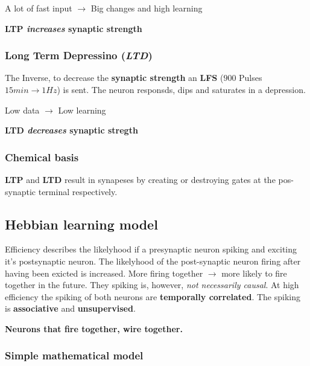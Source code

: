 \documentclass[
    fontsize      = 11pt,
    paper         = a4,
    twoside       = false,
    parskip       = half,
    pagesize      = false,
]{scrartcl}
\begin{document}
A lot of fast input \(\rightarrow\) Big changes and high learning

\textbf{LTP \emph{increases} synaptic strength}

\hypertarget{long-term-depressino-ltd}{%
\subsubsection{\texorpdfstring{Long Term Depressino
(\emph{LTD})}{Long Term Depressino (LTD)}}\label{long-term-depressino-ltd}}

The Inverse, to decrease the \textbf{synaptic strength} an \textbf{LFS}
(\(900\) Pulses \(15\si{min} \rightarrow 1\si{Hz}\)) is sent. The neuron
responsds, dips and saturates in a depression.

Low data \(\rightarrow\) Low learning

\textbf{LTD \emph{decreases} synaptic stregth}

\hypertarget{chemical-basis}{%
\subsubsection{Chemical basis}\label{chemical-basis}}

\textbf{LTP} and \textbf{LTD} result in synapeses by creating or
destroying gates at the pos-synaptic terminal respectively.

\hypertarget{hebbian-learning-model}{%
\subsection{Hebbian learning model}\label{hebbian-learning-model}}

Efficiency describes the likelyhood if a presynaptic neuron spiking and
exciting it's postsynaptic neuron. The likelyhood of the post-synaptic
neuron firing after having been exicted is increased. More firing
together \(\rightarrow\) more likely to fire together in the future.
They spiking is, however, \emph{not necessarily causal}. At high
efficiency the spiking of both neurons are \textbf{temporally
correlated}. The spiking is \textbf{associative} and
\textbf{unsupervised}.

\textbf{Neurons that fire together, wire together.}

\hypertarget{simple-mathematical-model}{%
\subsubsection{Simple mathematical
model}\label{simple-mathematical-model}}
\end{document}
